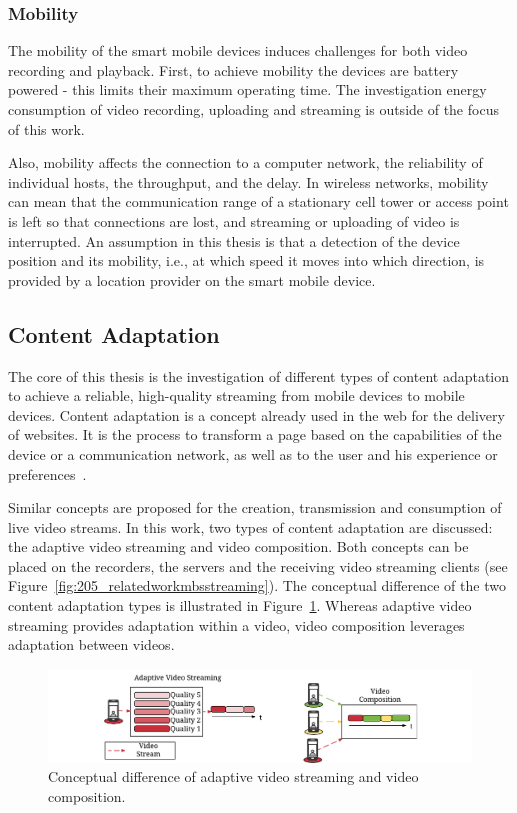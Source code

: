\subsubsection{Mobility}
The mobility of the smart mobile devices induces challenges for both video recording and playback.
First, to achieve mobility the devices are battery powered -  this limits their maximum operating time.
The investigation energy consumption of video recording, uploading and streaming is outside of the focus of this work.

Also, mobility affects the connection to a computer network, the reliability of individual hosts, the throughput, and the delay.
In wireless networks, mobility can mean that the communication range of a stationary cell tower or access point is left so that connections are lost, and streaming or uploading of video is interrupted.
An assumption in this thesis is that a detection of the device position and its mobility, i.e., at which speed it moves into which direction, is provided by a location provider on the smart mobile device.
\subsection{Content Adaptation}
The core of this thesis is the investigation of different types of content adaptation to achieve a reliable, high-quality streaming from mobile devices to mobile devices.
Content adaptation is a concept already used in the web for the delivery of websites.
It is the process to transform a page based on the capabilities of the device or a communication network, as well as to the user and his experience or preferences~\cite{Rabin10}.

Similar concepts are proposed for the creation, transmission and consumption of live video streams.
In this work, two types of content adaptation are discussed: the adaptive video streaming and video composition.
Both concepts can be placed on the recorders, the servers and the receiving video streaming clients (see Figure~\ref{fig:205_relatedworkmbsstreaming}).
The conceptual difference of the two content adaptation types is illustrated in Figure~\ref{fig:205_relatedworkcontentadaptation}.
Whereas adaptive video streaming provides adaptation within a video, video composition leverages adaptation between videos.
\begin{figure}[tbh]
	\centering
	\includegraphics[width=\linewidth]{gfx/200_Background/RelatedWork_ContentAdaptation}
	\caption[Adaptive video streaming versus video composition]{Conceptual difference of adaptive video streaming and video composition.}
	\label{fig:205_relatedworkcontentadaptation}
\end{figure}
